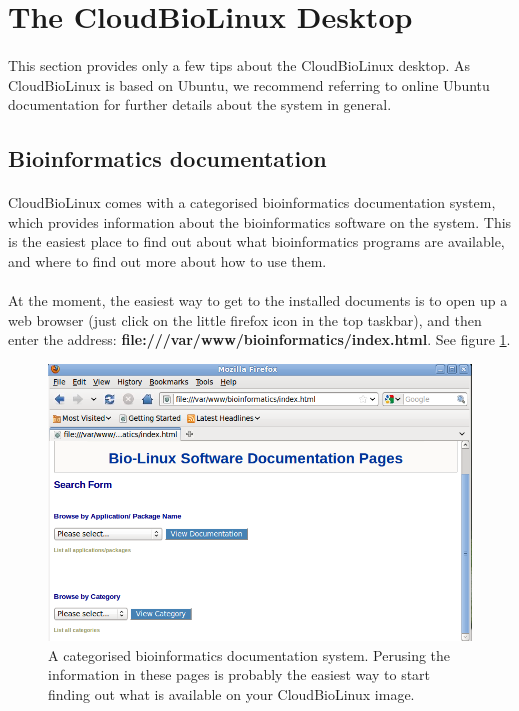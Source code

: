 \section{The CloudBioLinux Desktop}
\label{section:cloudblDesktop}
\paragraph{}This section provides only a few tips about the CloudBioLinux desktop. As CloudBioLinux is based on Ubuntu, we recommend referring to online Ubuntu documentation for further details about the system in general. 

\subsection{Bioinformatics documentation}

\paragraph{}CloudBioLinux comes with a categorised bioinformatics documentation system, which provides information about the bioinformatics software on the system. This is the easiest place to find out about what bioinformatics programs are available, and where to find out more about how to use them. 

\paragraph{}At the moment, the easiest way to get to the installed documents is to open up a web browser (just click on the little firefox icon in the top taskbar), and then enter the address:  \textbf{file:///var/www/bioinformatics/index.html}. See figure \ref{fig:bldocs}.

\begin{figure}[!hd]
	\fbox
	{
		\begin{minipage}{13cm}
\includegraphics[width=\maxwidth]{"images/blbioinfDocumentation"}
\caption[Bioinformatics docs]{\label{fig:bldocs}A categorised bioinformatics documentation system. Perusing the information in these pages is probably the easiest way to start finding out what is available on your CloudBioLinux image.}
		\end{minipage}
	}
\end{figure}


